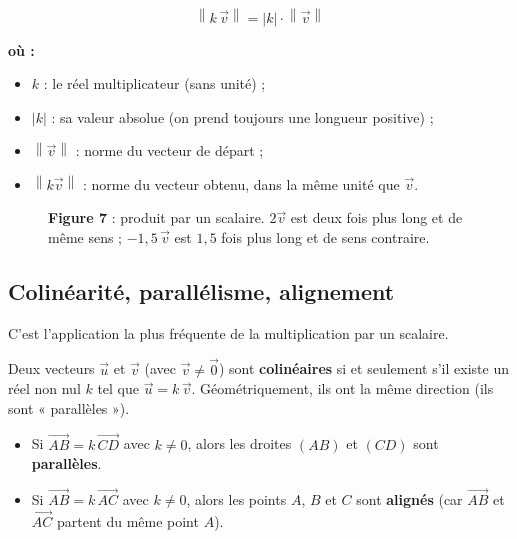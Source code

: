 \documentclass[11pt,a4paper]{article}
\newenvironment{ou}{%
  \par\smallskip\noindent\textbf{où :}\nopagebreak
  \begin{itemize}[leftmargin=1.8em,topsep=2pt,itemsep=1.5pt,parsep=0pt]}%
  {\end{itemize}}
\newcommand{\vc}[1]{\overrightarrow{#1}}        %
\providecommand{\norm}[1]{\left\lVert #1\right\rVert}
\begin{document}
\begin{formule}
\[
  \boxed{\;\norm{k\,\vec{v}}=|k|\cdot\norm{\vec{v}}\;}
\]
\begin{ou}
  \item $k$ : le réel multiplicateur (sans unité) ;
  \item $|k|$ : sa valeur absolue (on prend toujours une longueur positive) ;
  \item $\norm{\vec{v}}$ : norme du vecteur de départ ;
  \item $\norm{k\vec{v}}$ : norme du vecteur obtenu, dans la même unité que $\vec{v}$.
\end{ou}
\end{formule}

\begin{figure}[h]
\centering
{}
\caption{\textbf{\textcolor{primary}{Figure 7}} : produit par un scalaire. $2\vec{v}$ est deux fois plus long
et de même sens ; $-1{,}5\,\vec{v}$ est $1{,}5$ fois plus long et de sens contraire.}
\label{fig:scalaire}
\end{figure}

\subsection{Colinéarité, parallélisme, alignement}

C'est l'application la plus fréquente de la multiplication par un scalaire.

\begin{definition}
Deux vecteurs $\vec{u}$ et $\vec{v}$ (avec $\vec{v}\neq\vec{0}$) sont \textbf{colinéaires} si et
seulement s'il existe un réel non nul $k$ tel que $\vec{u}=k\,\vec{v}$. Géométriquement, ils ont la
même direction (ils sont « parallèles »).
\end{definition}

\begin{theoreme}
\begin{itemize}[leftmargin=1.6em,topsep=2pt,itemsep=2pt]
  \item Si $\vc{AB}=k\,\vc{CD}$ avec $k\neq 0$, alors les droites $(AB)$ et $(CD)$ sont
        \textbf{parallèles}.
  \item Si $\vc{AB}=k\,\vc{AC}$ avec $k\neq 0$, alors les points $A$, $B$ et $C$ sont \textbf{alignés}
        (car $\vc{AB}$ et $\vc{AC}$ partent du même point $A$).
\end{itemize}
\end{theoreme}
\end{document}
